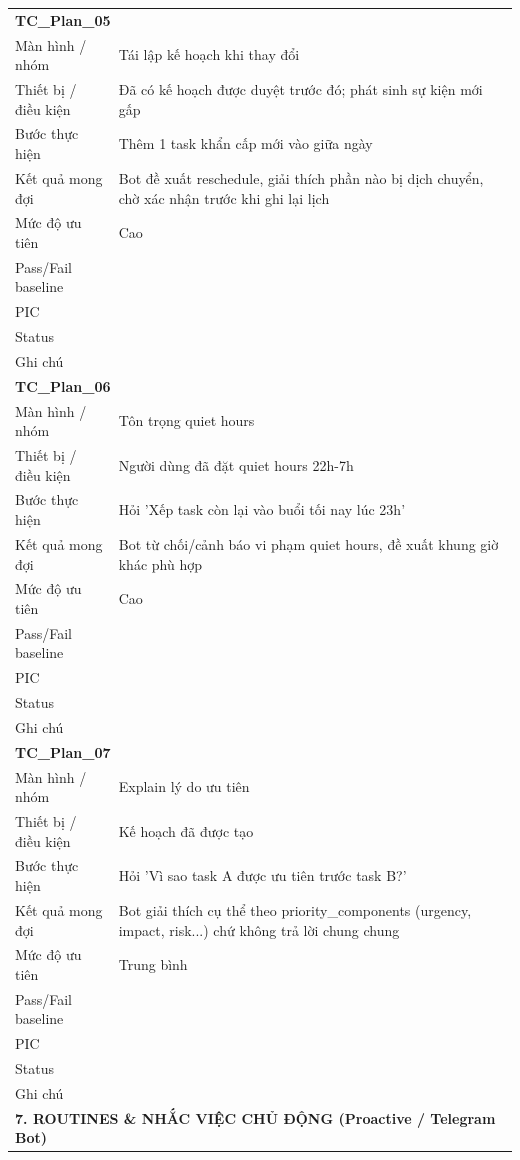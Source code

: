 \documentclass[12pt,a4paper]{article}
\begin{document}
\begin{longtable}{p{3.0cm}p{11.5cm}}
\midrule
\multicolumn{2}{l}{\textbf{TC\_Plan\_05}} \\
Màn hình / nhóm & Tái lập kế hoạch khi thay đổi \\
Thiết bị / điều kiện & Đã có kế hoạch được duyệt trước đó; phát sinh sự kiện mới gấp \\
Bước thực hiện & Thêm 1 task khẩn cấp mới vào giữa ngày \\
Kết quả mong đợi & Bot đề xuất reschedule, giải thích phần nào bị dịch chuyển, chờ xác nhận trước khi ghi lại lịch \\
Mức độ ưu tiên & Cao \\
Pass/Fail baseline &  \\
PIC &  \\
Status &  \\
Ghi chú &  \\
\midrule
\multicolumn{2}{l}{\textbf{TC\_Plan\_06}} \\
Màn hình / nhóm & Tôn trọng quiet hours \\
Thiết bị / điều kiện & Người dùng đã đặt quiet hours 22h-7h \\
Bước thực hiện & Hỏi 'Xếp task còn lại vào buổi tối nay lúc 23h' \\
Kết quả mong đợi & Bot từ chối/cảnh báo vi phạm quiet hours, đề xuất khung giờ khác phù hợp \\
Mức độ ưu tiên & Cao \\
Pass/Fail baseline &  \\
PIC &  \\
Status &  \\
Ghi chú &  \\
\midrule
\multicolumn{2}{l}{\textbf{TC\_Plan\_07}} \\
Màn hình / nhóm & Explain lý do ưu tiên \\
Thiết bị / điều kiện & Kế hoạch đã được tạo \\
Bước thực hiện & Hỏi 'Vì sao task A được ưu tiên trước task B?' \\
Kết quả mong đợi & Bot giải thích cụ thể theo priority\_components (urgency, impact, risk...) chứ không trả lời chung chung \\
Mức độ ưu tiên & Trung bình \\
Pass/Fail baseline &  \\
PIC &  \\
Status &  \\
Ghi chú &  \\
\midrule
\multicolumn{2}{l}{\textbf{7. ROUTINES \& NHẮC VIỆC CHỦ ĐỘNG (Proactive / Telegram Bot)}} \\ \midrule

\end{longtable}
\end{document}
